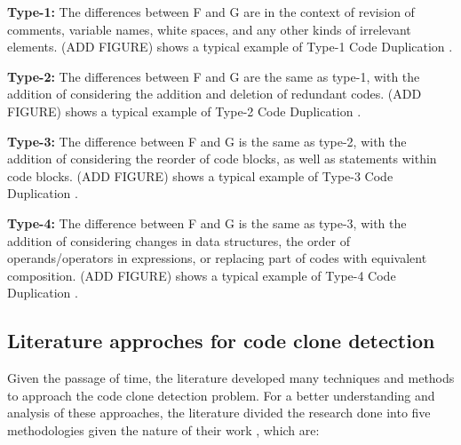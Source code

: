 \begin{itemize}
	\begin{item}
		\textbf{Type-1:} The differences between F and G are in the context of revision of comments, variable names,
		white spaces, and any other kinds of irrelevant elements. 
		(ADD FIGURE) shows a typical example of Type-1 Code 
		Duplication \citep{litreview}. 
	\end{item}
	\begin{item}
		\textbf{Type-2:} The differences between F and G are the same as type-1, with the addition of 
		considering the addition and deletion of redundant codes.
		(ADD FIGURE) shows a typical example of Type-2 Code Duplication \citep{litreview}. 
	\end{item}
	\begin{item}
		\textbf{Type-3:} The difference between F and G is the same as type-2, with the addition of considering 
		the reorder of code blocks, as well as statements within code blocks. (ADD FIGURE) shows a typical example of 
		Type-3 Code Duplication \citep{litreview}. 
	\end{item}
	\begin{item}
		\textbf{Type-4:} The difference between F and G is the same as type-3, with the addition of considering 
		changes in data structures, the order of operands/operators in expressions, or replacing part of codes 
		with equivalent composition.
		(ADD FIGURE) shows a typical example of Type-4 Code Duplication \citep{litreview}. 
	\end{item}



\end{itemize}

\subsection{Literature approches for code clone detection}

Given the passage of time, the literature developed many techniques and methods to approach the code clone 
detection problem. For a better understanding and analysis of these approaches, the literature divided the 
research done into five methodologies given the nature of their work  \citep{litreview}, which are:

